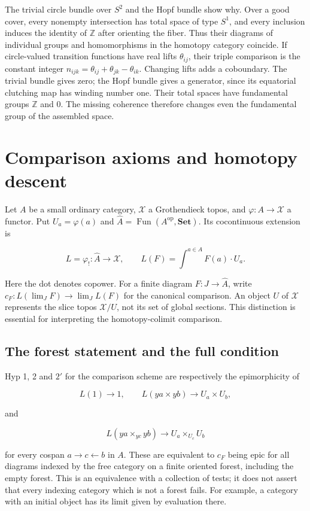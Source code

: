 \documentclass[11pt,a4paper]{article}
\theoremstyle{definition}
\begin{document}
The trivial circle bundle over $S^2$ and the Hopf bundle show why.
Over a good cover, every nonempty intersection has total space of
type $S^1$, and every inclusion induces the identity of $\mathbb Z$
after orienting the fiber. Thus their diagrams of individual groups
and homomorphisms in the homotopy category coincide. If circle-valued
transition functions have real lifts $\theta_{ij}$, their triple
comparison is the constant integer
$n_{ijk}=\theta_{ij}+\theta_{jk}-\theta_{ik}$. Changing lifts adds a
coboundary. The trivial bundle gives zero; the Hopf bundle gives a
generator, since its equatorial clutching map has winding number one.
Their total spaces have fundamental groups $\mathbb Z$ and $0$.
The missing coherence therefore changes even the fundamental group
of the assembled space.


\section{Comparison axioms and homotopy descent}\label{b.5.-comparison-axioms-and-homotopy-descent}

Let \(A\) be a small ordinary category, \(\mathcal X\) a Grothendieck
topos, and \(\varphi:A\to\mathcal X\) a functor. Put \(U_a=\varphi(a)\)
and \(\widehat A=\operatorname{Fun}(A^{\mathrm{op}},\mathbf{Set})\). Its
cocontinuous extension is

\[L=\varphi_!: \widehat A\to\mathcal X,\qquad L(F)=\int^{a\in A}F(a)\cdot U_a.\]

Here the dot denotes copower. For a finite diagram \(F:J\to\widehat A\),
write \(c_F:L(\lim_JF)\to\lim_JL(F)\) for the canonical comparison. An
object \(U\) of \(\mathcal X\) represents the slice topos
\(\mathcal X/U\), not its set of global sections. This distinction is
essential for interpreting the homotopy-colimit comparison.

\subsection{The forest statement and the full
condition}\label{b5.1.-the-forest-statement-and-the-full-condition}

Hyp 1, 2 and \(2'\) for the comparison scheme are
respectively the epimorphicity of

\[L(1)\to1,\qquad L(ya\times yb)\to U_a\times U_b,\]

and

\[L(ya\times_{yc}yb)\to U_a\times_{U_c}U_b\]

for every cospan \(a\to c\leftarrow b\) in \(A\). These are equivalent
to \(c_F\) being epic for all diagrams indexed by the free category on a
finite oriented forest, including the empty forest. This is an
equivalence with a collection of tests; it does not assert that every
indexing category which is not a forest fails. For example, a category
with an initial object has its limit given by evaluation there.
\end{document}
